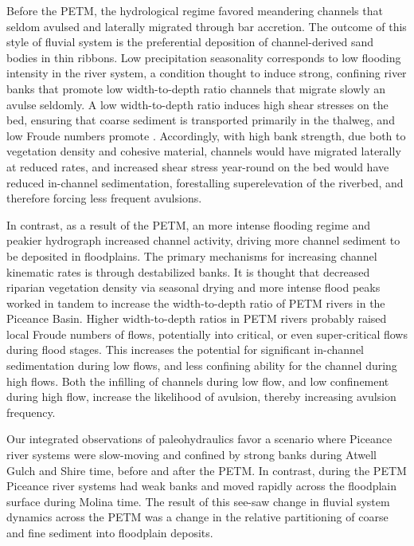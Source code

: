 \documentclass[draft]{compact_proposal}\usepackage[]{graphicx}\usepackage[]{color}
\begin{document}
Before the PETM, the  hydrological regime favored meandering channels that seldom avulsed and laterally migrated through bar accretion.
The outcome of this style of fluvial system is the preferential deposition of channel-derived sand bodies in thin ribbons.
Low precipitation seasonality corresponds to low flooding intensity in the river system, a condition thought to induce strong, confining river banks that promote low width-to-depth ratio channels that migrate slowly an avulse seldomly.
A low width-to-depth ratio induces high shear stresses on the bed, ensuring that coarse sediment is transported primarily in the thalweg, and low Froude numbers promote \pnote[something].
Accordingly, with high bank strength, due both to vegetation density and cohesive material, channels would have migrated laterally at reduced rates, and increased shear stress year-round on the bed would have reduced in-channel sedimentation, forestalling superelevation of the riverbed, and therefore forcing less frequent avulsions.

In contrast, as a result of the PETM, an more intense flooding regime and peakier hydrograph increased channel activity, driving more channel sediment to be deposited in floodplains.
The primary mechanisms for increasing channel kinematic rates is through destabilized banks.
It is thought that decreased riparian vegetation density via seasonal drying and more intense flood peaks worked in tandem to increase the width-to-depth ratio of PETM rivers in the Piceance Basin.
Higher width-to-depth ratios in PETM rivers probably raised local Froude numbers of flows, potentially into critical, or even super-critical flows during flood stages.
This increases the potential for significant in-channel sedimentation during low flows, and less confining ability for the channel during high flows.
Both the infilling of channels during low flow, and low confinement during high flow, increase the likelihood of avulsion, thereby increasing avulsion frequency.

Our integrated observations of paleohydraulics favor a scenario where Piceance river systems were slow-moving and confined by strong banks during Atwell Gulch and Shire time, before and after the PETM.
In contrast, during the PETM Piceance river systems had weak banks and moved rapidly across the floodplain surface during Molina time.
The result of this see-saw change in fluvial system dynamics across the PETM was a change in the relative partitioning of coarse and fine sediment into floodplain deposits.
\end{document}
